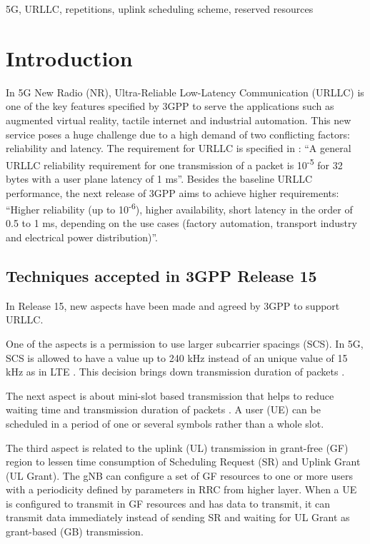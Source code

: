 \documentclass[conference]{IEEEtran}
\begin{document}
\begin{IEEEkeywords}
5G, URLLC, repetitions, uplink scheduling scheme, reserved resources
\end{IEEEkeywords}

\section{Introduction} \label{I}
In 5G New Radio (NR), Ultra-Reliable Low-Latency Communication (URLLC) is one of the key features specified by 3GPP to serve the applications such as augmented virtual reality, tactile internet and industrial automation. This new service poses a huge challenge due to a high demand of two conflicting factors: reliability and latency. The requirement for URLLC is specified in \cite{b6}: ``A general URLLC reliability requirement for one transmission of a packet is 10\textsuperscript{-5} for 32 bytes with a user plane latency of 1 ms''. Besides the baseline URLLC performance, the next release of 3GPP aims to achieve higher requirements: ``Higher reliability (up to 10\textsuperscript{-6}), higher availability, short latency in the order of 0.5 to 1 ms, depending on the use cases (factory automation, transport industry and electrical power distribution)''\cite{b8}.

\subsection{Techniques accepted in 3GPP Release 15}\label{IAA}
In Release 15, new aspects have been made and agreed by 3GPP to support URLLC. 

One of the aspects is a permission to use larger subcarrier spacings (SCS). In 5G, SCS is allowed to have a value up to 240 kHz instead of an unique value of 15 kHz as in LTE \cite{ad2}. This decision brings down transmission duration of packets . 

The next aspect is about mini-slot based transmission that helps to reduce waiting time and transmission duration of packets \cite{ad3}. A user (UE) can be scheduled in a period of one or several symbols rather than a whole slot. 

The third aspect is related to the uplink (UL) transmission in grant-free (GF) region to lessen time consumption of Scheduling Request (SR) and Uplink Grant (UL Grant)\cite{ad4}. The gNB can configure a set of GF resources to one or more users with a periodicity defined by parameters in RRC from higher layer. When a UE is configured to transmit in GF resources and has data to transmit, it can transmit data immediately instead of sending SR and waiting for UL Grant as grant-based (GB) transmission.
\end{document}
